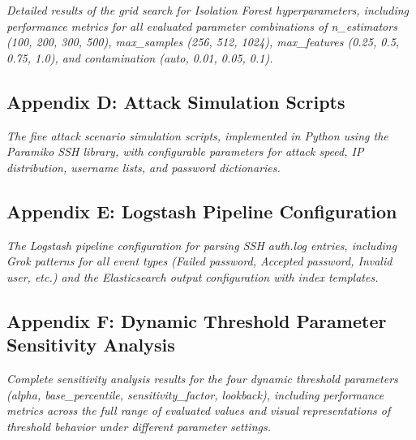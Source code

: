 \documentclass[
  a4paper]{report}
\begin{document}
\emph{Detailed results of the grid search for Isolation Forest
hyperparameters, including performance metrics for all evaluated
parameter combinations of n\_estimators (100, 200, 300, 500),
max\_samples (256, 512, 1024), max\_features (0.25, 0.5, 0.75, 1.0), and
contamination (auto, 0.01, 0.05, 0.1).}

\subsection{Appendix D: Attack Simulation
Scripts}\label{appendix-d-attack-simulation-scripts}

\emph{The five attack scenario simulation scripts, implemented in Python
using the Paramiko SSH library, with configurable parameters for attack
speed, IP distribution, username lists, and password dictionaries.}

\subsection{Appendix E: Logstash Pipeline
Configuration}\label{appendix-e-logstash-pipeline-configuration}

\emph{The Logstash pipeline configuration for parsing SSH auth.log
entries, including Grok patterns for all event types (Failed password,
Accepted password, Invalid user, etc.) and the Elasticsearch output
configuration with index templates.}

\subsection{Appendix F: Dynamic Threshold Parameter Sensitivity
Analysis}\label{appendix-f-dynamic-threshold-parameter-sensitivity-analysis}

\emph{Complete sensitivity analysis results for the four dynamic
threshold parameters (alpha, base\_percentile, sensitivity\_factor,
lookback), including performance metrics across the full range of
evaluated values and visual representations of threshold behavior under
different parameter settings.}
\end{document}
